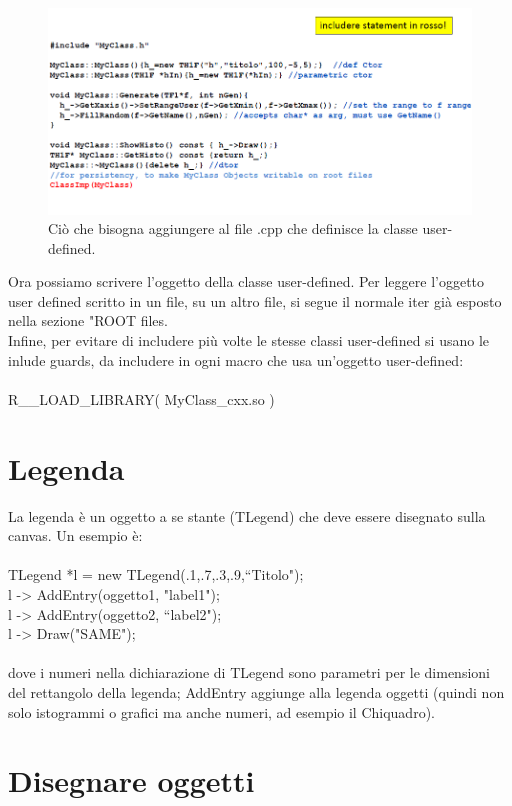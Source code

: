 \documentclass[10pt,a4paper]{article}
\begin{document}
\begin{figure}[h!]
	\centering
	\includegraphics[width=1.\linewidth]{classi-root-2}
	\caption{Ciò che bisogna aggiungere al file .cpp che definisce la classe user-defined.}
	\label{fig:classi-root-2}
\end{figure}
\FloatBarrier
Ora possiamo scrivere l'oggetto della classe user-defined. Per leggere l'oggetto user defined scritto in un file, su un altro file, si segue il normale iter già esposto nella sezione "ROOT files.\\
Infine, per evitare di includere più volte le stesse classi user-defined si usano le inlude guards, da includere in ogni macro che usa un'oggetto user-defined:\\\\
R\_\_LOAD\_LIBRARY( MyClass\_cxx.so )\\
\section{Legenda}
La legenda è un oggetto a se stante (TLegend) che deve essere disegnato sulla canvas. Un esempio è:\\\\
TLegend *l = new TLegend(.1,.7,.3,.9,“Titolo");\\
l -> AddEntry(oggetto1, "label1");\\
l -> AddEntry(oggetto2, “label2");\\
l -> Draw("SAME");\\\\
dove i numeri nella dichiarazione di TLegend sono parametri per le dimensioni del rettangolo della legenda; AddEntry aggiunge alla legenda oggetti (quindi non solo istogrammi o grafici ma anche numeri, ad esempio il Chiquadro). 
\section{Disegnare oggetti}
\end{document}
